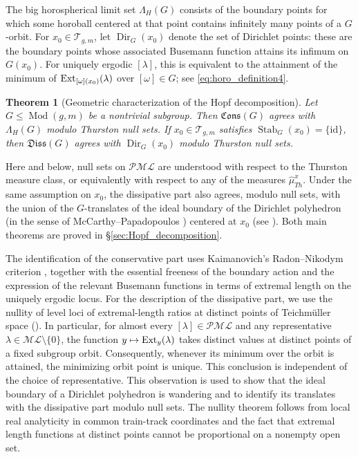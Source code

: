 \documentclass[dvipdfmx]{amsart}
\newtheorem{theorem}{Theorem}[section]
\theoremstyle{remark}
\newcommand{\ext}{{\rm Ext}}
\newcommand{\teich}{\mathcal{T}}
\newcommand{\tmod}{\operatorname{Mod}}
\newcommand{\PThursM}{\hat{\mu}_{Th}}
\newcommand{\ml}{\mathcal{ML}}
\newcommand{\pml}{\mathcal{PML}}
\newcommand{\conservativepart}{\mathfrak{Cons}}
\newcommand{\dissipativepart}{\mathfrak{Diss}}
\begin{document}
The big horospherical limit set $\Lambda_H(G)$ consists
of the boundary points for which some horoball centered at that point
contains infinitely many points of a $G$-orbit.
For $x_0\in\teich_{g,m}$, let $\operatorname{Dir}_G(x_0)$ denote
the set of Dirichlet points: these are the boundary points whose
associated Busemann function attains its infimum on $G(x_0)$.
For uniquely ergodic $[\lambda]$, this is equivalent to the
attainment of the minimum of $\ext_{[\omega](x_0)}(\lambda)$ over
$[\omega]\in G$; see \eqref{eq:horo_definition4}.

\begin{theorem}[Geometric characterization of the Hopf decomposition]
\label{thm:main_classfication_limit_sets}
Let $G\le\tmod(g,m)$ be a nontrivial subgroup.
Then $\conservativepart(G)$ agrees with $\Lambda_H(G)$ modulo
Thurston null sets.
If $x_0\in\teich_{g,m}$ satisfies
$\operatorname{Stab}_G(x_0)=\{\mathrm{id}\}$, then
$\dissipativepart(G)$ agrees with $\operatorname{Dir}_G(x_0)$
modulo Thurston null sets.
\end{theorem}

Here and below, null sets on $\pml$ are understood with respect to the Thurston measure class, or equivalently with respect to any of the measures $\PThursM^x$.
Under the same assumption on $x_0$, the dissipative part also agrees, modulo null sets, with the union of the $G$-translates of the ideal boundary of the Dirichlet polyhedron (in the sense of McCarthy--Papadopoulos \cite{McCarthyPapadopoulos1996}) centered at $x_0$ (see ).
Both main theorems are proved in \S\ref{sec:Hopf_decomposition}.

The identification of the conservative part uses Kaimanovich's
Radon--Nikodym criterion \cite[Theorem~29]{Kaimanovich2010}, together
with the essential freeness of the boundary action and the expression of the relevant Busemann functions in terms of extremal length on the uniquely ergodic locus.
For the description of the dissipative part, we use the nullity of level loci of extremal-length ratios at distinct points of Teichm\"uller space (). 
In particular, for almost every $[\lambda]\in\pml$
and any representative $\lambda\in\ml\setminus\{0\}$,
the function $y\mapsto\ext_y(\lambda)$ takes distinct
values at distinct points of a fixed subgroup orbit.
Consequently, whenever its minimum over the orbit is attained,
the minimizing orbit point is unique.
This conclusion is independent of the choice of representative.
This observation is used to show that the ideal boundary of a Dirichlet polyhedron is wandering and to identify its translates with the dissipative part modulo null sets. 
The nullity theorem follows from local real analyticity
in common train-track coordinates and the fact that
extremal length functions at distinct points cannot
be proportional on a nonempty open set.
\end{document}
